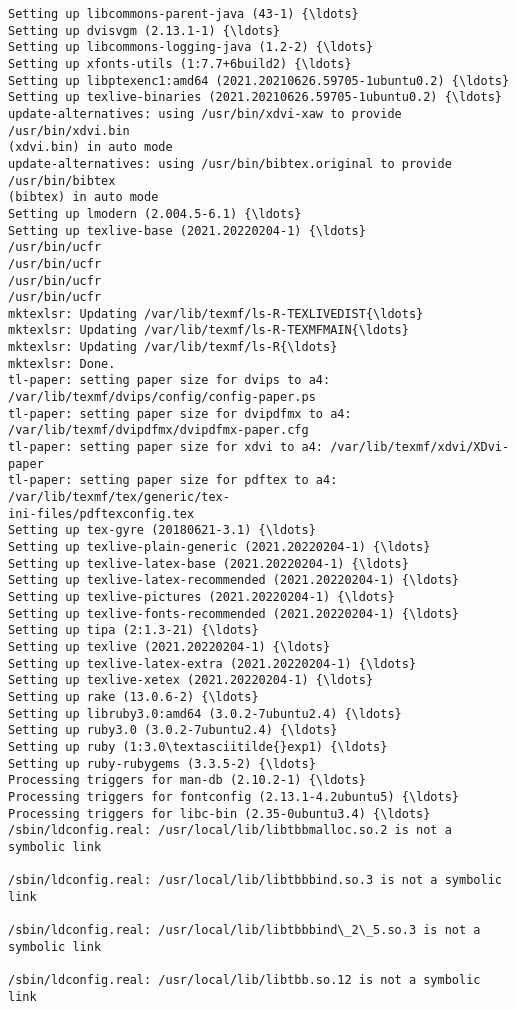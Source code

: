 \documentclass[11pt]{article}
\begin{document}
\begin{Verbatim}[commandchars=\\\{\}]
Setting up libcommons-parent-java (43-1) {\ldots}
Setting up dvisvgm (2.13.1-1) {\ldots}
Setting up libcommons-logging-java (1.2-2) {\ldots}
Setting up xfonts-utils (1:7.7+6build2) {\ldots}
Setting up libptexenc1:amd64 (2021.20210626.59705-1ubuntu0.2) {\ldots}
Setting up texlive-binaries (2021.20210626.59705-1ubuntu0.2) {\ldots}
update-alternatives: using /usr/bin/xdvi-xaw to provide /usr/bin/xdvi.bin
(xdvi.bin) in auto mode
update-alternatives: using /usr/bin/bibtex.original to provide /usr/bin/bibtex
(bibtex) in auto mode
Setting up lmodern (2.004.5-6.1) {\ldots}
Setting up texlive-base (2021.20220204-1) {\ldots}
/usr/bin/ucfr
/usr/bin/ucfr
/usr/bin/ucfr
/usr/bin/ucfr
mktexlsr: Updating /var/lib/texmf/ls-R-TEXLIVEDIST{\ldots}
mktexlsr: Updating /var/lib/texmf/ls-R-TEXMFMAIN{\ldots}
mktexlsr: Updating /var/lib/texmf/ls-R{\ldots}
mktexlsr: Done.
tl-paper: setting paper size for dvips to a4:
/var/lib/texmf/dvips/config/config-paper.ps
tl-paper: setting paper size for dvipdfmx to a4:
/var/lib/texmf/dvipdfmx/dvipdfmx-paper.cfg
tl-paper: setting paper size for xdvi to a4: /var/lib/texmf/xdvi/XDvi-paper
tl-paper: setting paper size for pdftex to a4: /var/lib/texmf/tex/generic/tex-
ini-files/pdftexconfig.tex
Setting up tex-gyre (20180621-3.1) {\ldots}
Setting up texlive-plain-generic (2021.20220204-1) {\ldots}
Setting up texlive-latex-base (2021.20220204-1) {\ldots}
Setting up texlive-latex-recommended (2021.20220204-1) {\ldots}
Setting up texlive-pictures (2021.20220204-1) {\ldots}
Setting up texlive-fonts-recommended (2021.20220204-1) {\ldots}
Setting up tipa (2:1.3-21) {\ldots}
Setting up texlive (2021.20220204-1) {\ldots}
Setting up texlive-latex-extra (2021.20220204-1) {\ldots}
Setting up texlive-xetex (2021.20220204-1) {\ldots}
Setting up rake (13.0.6-2) {\ldots}
Setting up libruby3.0:amd64 (3.0.2-7ubuntu2.4) {\ldots}
Setting up ruby3.0 (3.0.2-7ubuntu2.4) {\ldots}
Setting up ruby (1:3.0\textasciitilde{}exp1) {\ldots}
Setting up ruby-rubygems (3.3.5-2) {\ldots}
Processing triggers for man-db (2.10.2-1) {\ldots}
Processing triggers for fontconfig (2.13.1-4.2ubuntu5) {\ldots}
Processing triggers for libc-bin (2.35-0ubuntu3.4) {\ldots}
/sbin/ldconfig.real: /usr/local/lib/libtbbmalloc.so.2 is not a symbolic link

/sbin/ldconfig.real: /usr/local/lib/libtbbbind.so.3 is not a symbolic link

/sbin/ldconfig.real: /usr/local/lib/libtbbbind\_2\_5.so.3 is not a symbolic link

/sbin/ldconfig.real: /usr/local/lib/libtbb.so.12 is not a symbolic link


\end{Verbatim}
\end{document}
